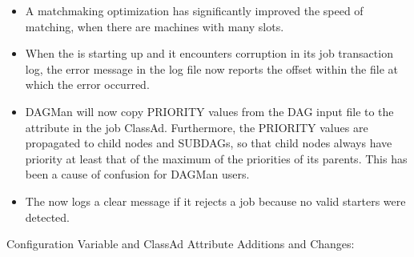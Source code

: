 \begin{itemize}

\item A matchmaking optimization has significantly improved the speed 
of matching,
when there are machines with many slots.

\item When the  is starting up and it encounters corruption
in its job transaction log, the error message in the log file now reports
the offset within the file at which the error occurred.

\item DAGMan will now copy PRIORITY values from the DAG input file to 
the  attribute in the job ClassAd.  
Furthermore, the PRIORITY values are propagated to child nodes and SUBDAGs, 
so that child nodes always have priority at least that
of the maximum of the priorities of its parents.  
This has been a cause of confusion for DAGMan users.

\item The  now logs a clear message if it rejects a job
because no valid starters were detected.

\end{itemize}

\noindent Configuration Variable and ClassAd Attribute Additions and Changes:

